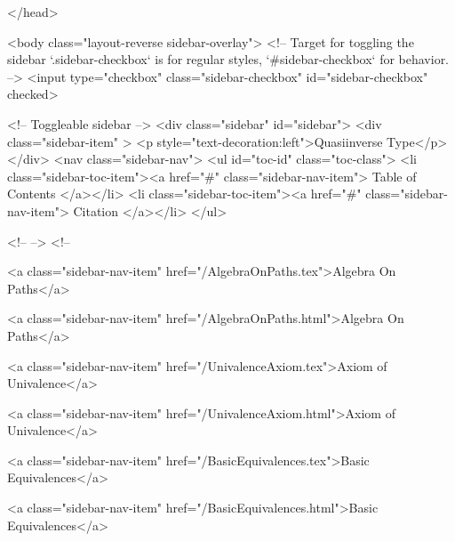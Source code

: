   
</head>




  <body class="layout-reverse sidebar-overlay">
    <!-- Target for toggling the sidebar `.sidebar-checkbox` is for regular
     styles, `#sidebar-checkbox` for behavior. -->
<input type="checkbox" class="sidebar-checkbox" id="sidebar-checkbox" checked>

<!-- Toggleable sidebar -->
<div class="sidebar" id="sidebar">
  <div class="sidebar-item" >
    <p style="text-decoration:left">Quasiinverse Type</p>
  </div>
  <nav class="sidebar-nav">
    <ul id="toc-id" class="toc-class">
  <li class="sidebar-toc-item"><a href="#" class="sidebar-nav-item"> Table of Contents </a></li>
  <li class="sidebar-toc-item"><a href="#" class="sidebar-nav-item"> Citation </a></li>
</ul>


    <!--  -->
    <!-- 
      
    
      
    
      
    
      
    
      
        
      
    
      
        
          <a class="sidebar-nav-item" href="/AlgebraOnPaths.tex">Algebra On Paths</a>
        
      
    
      
        
          <a class="sidebar-nav-item" href="/AlgebraOnPaths.html">Algebra On Paths</a>
        
      
    
      
        
          <a class="sidebar-nav-item" href="/UnivalenceAxiom.tex">Axiom of Univalence</a>
        
      
    
      
        
          <a class="sidebar-nav-item" href="/UnivalenceAxiom.html">Axiom of Univalence</a>
        
      
    
      
        
          <a class="sidebar-nav-item" href="/BasicEquivalences.tex">Basic Equivalences</a>
        
      
    
      
        
          <a class="sidebar-nav-item" href="/BasicEquivalences.html">Basic Equivalences</a>
        
